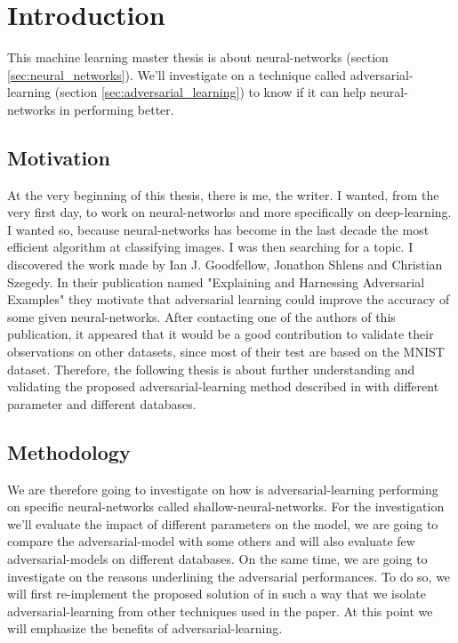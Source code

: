 
\chapter{Introduction} 
\label{sec:introduction}
	
	This machine learning master thesis is about neural-networks (section \ref{sec:neural_networks}). We'll investigate on a technique called adversarial-learning (section \ref{sec:adversarial_learning}) to know if it can help neural-networks in performing better.


	\section{Motivation}
		At the very beginning of this thesis, there is me, the writer. I wanted, from the very first day, to work on neural-networks and more specifically on deep-learning. I wanted so, because neural-networks has become in the last decade the most efficient algorithm at classifying images. 
		I was then searching for a topic. I discovered the work made by Ian J. Goodfellow, Jonathon Shlens and Christian Szegedy. In their publication named "Explaining and Harnessing Adversarial Examples"\cite{goodfellow2014explaining} they motivate that adversarial learning could improve the accuracy of some given neural-networks. After contacting one of the authors of this publication, it appeared that it would be a good contribution to validate their observations on other datasets, since most of their test are based on the MNIST dataset\cite{lecunmnist}. Therefore, the following thesis is about further understanding and validating the proposed adversarial-learning method described in \cite{goodfellow2014explaining} with different parameter and different databases.

	\section{Methodology}
		We are therefore going to investigate on how is adversarial-learning performing on specific neural-networks called shallow-neural-networks. For the investigation we'll evaluate the impact of different parameters on the model, we are going to compare the adversarial-model with some others and will also evaluate few adversarial-models on different databases. On the same time, we are going to investigate on the reasons underlining the adversarial performances. To do so, we will first re-implement the proposed solution of \cite{goodfellow2014explaining} in such a way that we isolate adversarial-learning from other techniques used in the paper. At this point we will emphasize the benefits of adversarial-learning.

